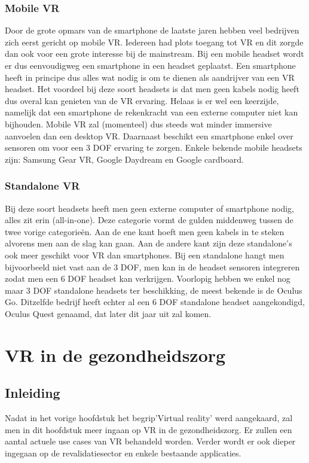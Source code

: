 \subsection{Mobile VR}
Door de grote opmars van de smartphone de laatste jaren hebben veel bedrijven zich eerst gericht op mobile VR. Iedereen had plots toegang tot VR en dit zorgde dan ook voor een grote interesse bij de mainstream. Bij een mobile headset wordt er dus eenvoudigweg een smartphone in een headset geplaatst.
Een smartphone heeft in principe dus alles wat nodig is om te dienen als aandrijver van een VR headset. Het voordeel bij deze soort headsets is dat men geen kabels nodig heeft dus overal kan genieten van de VR ervaring. Helaas is er wel een keerzijde, namelijk dat een smartphone de rekenkracht van een externe computer niet kan bijhouden. Mobile VR zal (momenteel) dus steeds wat minder immersive aanvoelen dan een desktop VR. Daarnaast beschikt een smartphone enkel over sensoren om voor een 3 DOF ervaring te zorgen.
Enkele bekende mobile headsets zijn: Samsung Gear VR, Google Daydream en Google cardboard.

\subsection{Standalone VR}
Bij deze soort headsets heeft men geen externe computer of smartphone nodig, alles zit erin (all-in-one). Deze categorie vormt de gulden middenweg tussen de twee vorige categorieën. Aan de ene kant hoeft men geen kabels in te steken alvorens men aan de slag kan gaan. Aan de andere kant zijn deze standalone's ook meer geschikt voor VR dan smartphones. Bij een standalone hangt men bijvoorbeeld niet vast aan de 3 DOF, men kan in de headset sensoren integreren zodat men een 6 DOF headset kan verkrijgen. Voorlopig hebben we enkel nog maar 3 DOF standalone headsets ter beschikking, de meest bekende is de Oculus Go. Ditzelfde bedrijf heeft echter al een 6 DOF standalone headset aangekondigd, Oculus Quest genaamd, dat later dit jaar uit zal komen.


\chapter{VR in de gezondheidszorg}
\section{Inleiding}
Nadat in het vorige hoofdstuk het begrip'Virtual reality' werd aangekaard, zal men in dit hoofdstuk meer ingaan op VR in de gezondheidszorg. Er zullen een aantal actuele use cases van VR behandeld worden. Verder wordt er ook dieper ingegaan op de revalidatiesector en enkele bestaande applicaties.

